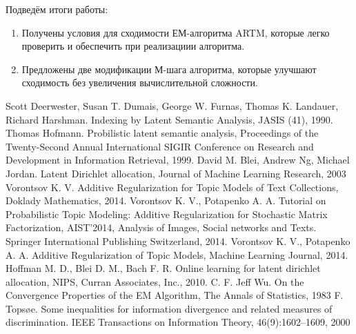 \documentclass[12pt]{article}
\begin{document}
Подведём итоги работы: 
\begin{enumerate}
\item Получены условия для сходимости ЕМ-алгоритма ARTM, которые легко проверить и обеспечить при реализациии алгоритма.
\item Предложены две модификации М-шага алгоритма, которые улучшают сходимость без увеличения вычислительной сложности.
\end{enumerate}
\newpage
	\begin{thebibliography}{@@@@}
		Scott Deerwester, Susan T. Dumais, George W. Furnas, Thomas K. Landauer, Richard Harshman. Indexing by Latent Semantic Analysis,  JASIS (41), 1990.
		Thomas Hofmann. Probilistic latent semantic analysis, Proceedings of the Twenty-Second Annual International SIGIR Conference on Research and Development in Information Retrieval, 1999.
		David M. Blei, Andrew Ng, Michael Jordan. Latent Dirichlet allocation, Journal of Machine Learning Research,  2003
		Vorontsov K. V. Additive Regularization for Topic Models of Text Collections, Doklady Mathematics, 2014.
		Vorontsov K. V., Potapenko A. A. Tutorial on Probabilistic Topic Modeling: Additive Regularization for Stochastic Matrix Factorization,  AIST’2014, Analysis of Images, Social networks and Texts. Springer International Publishing Switzerland, 2014.
		Vorontsov K. V., Potapenko A. A. Additive Regularization of Topic Models, Machine Learning Journal, 2014.
		Hoffman M. D., Blei D. M., Bach F. R. Online learning for latent dirichlet allocation, NIPS, Curran Associates, Inc., 2010.
		C. F. Jeff Wu. On the Convergence Properties of the EM Algorithm, The Annals of Statistics, 1983
		F. Topsøe. Some inequalities for information divergence and related measures of discrimination. IEEE Transactions on Information Theory, 46(9):1602–1609, 2000
	\end{thebibliography}
\end{document}
